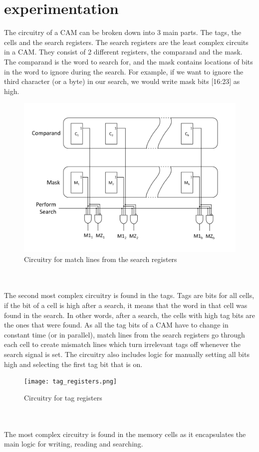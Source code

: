 \section{experimentation}
The circuitry of a CAM can be broken down into 3 main parts. The tags, the cells and the search registers. 
The search registers are the least complex circuits in a CAM. They consist of 2 different registers, the comparand and the mask. 
The comparand is the word to search for, and the mask contains locations of bits in the word to ignore during the search.
For example, if we want to ignore the third character (or a byte) in our search, we would write mask bits [16:23] as high.
\begin{figure}
    \includegraphics[width=1\columnwidth]{search_registers.png}
    \caption[Short text]{Circuitry for match lines from the search registers}
\end{figure}
\\\\
The second most complex circuitry is found in the tags.
Tags are bits for all cells, if the bit of a cell is high after a search, it means that the word in that cell was found in the search. 
In other words, after a search, the cells with high tag bits are the ones that were found. 
As all the tag bits of a CAM have to change in constant time (or in parallel), match lines from the search registers go through each cell to create mismatch lines which turn irrelevant tags off whenever the search signal is set.
The circuitry also includes logic for manually setting all bits high and selecting the first tag bit that is on.
\begin{figure}
    \texttt{[image: tag\_registers.png]}
    \caption[Short text]{Circuitry for tag registers}
\end{figure}
\\\\
The most complex circuitry is found in the memory cells as it encapsulates the main logic for writing, reading and searching.
